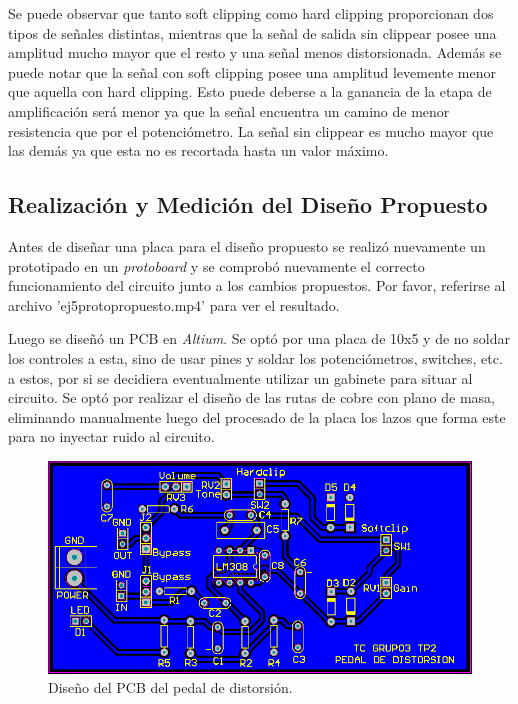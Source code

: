 Se puede observar que tanto soft clipping como hard clipping proporcionan dos tipos de señales distintas, mientras que la señal de salida sin clippear posee una amplitud mucho mayor que el resto y una señal menos distorsionada. Además se puede notar que la señal con soft clipping posee una amplitud levemente menor que aquella con hard clipping. Esto puede deberse a la ganancia de la etapa de amplificación será menor ya que la señal encuentra un camino de menor resistencia que por el potenciómetro. La señal sin clippear es mucho mayor que las demás ya que esta no es recortada hasta un valor máximo.

\subsection{Realización y Medición del Diseño Propuesto}

Antes de diseñar una placa para el diseño propuesto se realizó nuevamente un prototipado en un \textit{protoboard} y se comprobó nuevamente el correcto funcionamiento del circuito junto a los cambios propuestos. Por favor, referirse al archivo 'ej5protopropuesto.mp4' para ver el resultado.


Luego se diseñó un PCB en \textit{Altium}. Se optó por una placa de 10x5 y de no soldar los controles a esta, sino de usar pines y soldar los potenciómetros, switches, etc. a estos, por si se decidiera eventualmente utilizar un gabinete para situar al circuito.
Se optó por realizar el diseño de las rutas de cobre con plano de masa, eliminando manualmente luego del procesado de la placa los lazos que forma este para no inyectar ruido al circuito.\\

\begin{figure}[H]
	\centering
	\includegraphics[width=1\textwidth, trim={0 0 0 0}, clip]{Ejercicio5/Imagenes/Circuito_base/Sim/pcb.png}
	\caption{Diseño del PCB del pedal de distorsión.}
	\label{fig:pcb}
\end{figure}

